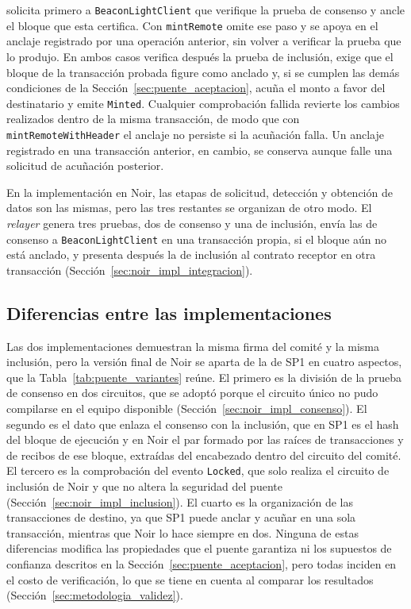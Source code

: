 \begin{enumerate}
	solicita primero a \texttt{BeaconLightClient} que verifique la prueba de consenso y ancle el bloque que esta
	certifica. Con \lstinline|mintRemote| omite ese paso y se apoya en el anclaje registrado por una
	operación anterior, sin volver a verificar la prueba que lo produjo. En ambos casos verifica
	después la prueba de inclusión, exige que el bloque de la transacción probada figure como anclado
	y, si se cumplen las demás condiciones de la Sección~\ref{sec:puente_aceptacion}, acuña el monto
	a favor del destinatario y emite \texttt{Minted}. Cualquier comprobación fallida revierte los
	cambios realizados dentro de la misma transacción, de modo que con
	\lstinline|mintRemoteWithHeader| el anclaje no persiste si la acuñación falla. Un anclaje
	registrado en una transacción anterior, en cambio, se conserva aunque falle una solicitud de
	acuñación posterior.
\end{enumerate}

En la implementación en Noir, las etapas de solicitud, detección y obtención de datos son las
mismas, pero las tres restantes se organizan de otro modo. El \textit{relayer} genera tres pruebas,
dos de consenso y una de inclusión, envía las de consenso a \texttt{BeaconLightClient} en una
transacción propia, si el bloque aún no está anclado, y presenta después la de inclusión al
contrato receptor en otra transacción (Sección~\ref{sec:noir_impl_integracion}).

\subsection{Diferencias entre las implementaciones}
\label{sec:puente_variantes}

Las dos implementaciones demuestran la misma firma del comité y la misma inclusión, pero la
versión final de Noir se aparta de la de SP1 en cuatro aspectos, que la
Tabla~\ref{tab:puente_variantes} reúne. El primero es la división de la prueba de consenso en dos
circuitos, que se adoptó porque el circuito único no pudo compilarse en el equipo disponible
(Sección~\ref{sec:noir_impl_consenso}). El segundo es el dato que enlaza el consenso con la
inclusión, que en SP1 es el hash del bloque de ejecución y en Noir el par formado por las raíces
de transacciones y de recibos de ese bloque, extraídas del encabezado dentro del circuito del
comité. El tercero es la comprobación del evento \texttt{Locked}, que solo realiza el circuito de
inclusión de Noir y que no altera la seguridad del puente (Sección~\ref{sec:noir_impl_inclusion}).
El cuarto es la organización de las transacciones de destino, ya que SP1 puede anclar y acuñar en
una sola transacción, mientras que Noir lo hace siempre en dos. Ninguna de estas diferencias
modifica las propiedades que el puente garantiza ni los supuestos de confianza descritos en la
Sección~\ref{sec:puente_aceptacion}, pero todas inciden en el costo de verificación, lo que se
tiene en cuenta al comparar los resultados (Sección~\ref{sec:metodologia_validez}).

